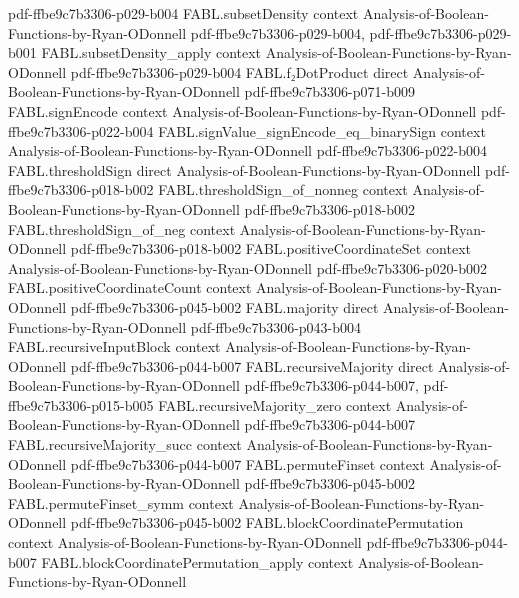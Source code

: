 \begin{theorem}
  {pdf-ffbe9c7b3306-p029-b004}
\proofstep
  {FABL.subsetDensity}
  {context}
  {Analysis-of-Boolean-Functions-by-Ryan-ODonnell}
  {pdf-ffbe9c7b3306-p029-b004,
    pdf-ffbe9c7b3306-p029-b001}
\proofstep
  {FABL.subsetDensity_apply}
  {context}
  {Analysis-of-Boolean-Functions-by-Ryan-ODonnell}
  {pdf-ffbe9c7b3306-p029-b004}
\proofstep
  {FABL.f₂DotProduct}
  {direct}
  {Analysis-of-Boolean-Functions-by-Ryan-ODonnell}
  {pdf-ffbe9c7b3306-p071-b009}
\proofstep
  {FABL.signEncode}
  {context}
  {Analysis-of-Boolean-Functions-by-Ryan-ODonnell}
  {pdf-ffbe9c7b3306-p022-b004}
\proofstep
  {FABL.signValue_signEncode_eq_binarySign}
  {context}
  {Analysis-of-Boolean-Functions-by-Ryan-ODonnell}
  {pdf-ffbe9c7b3306-p022-b004}
\proofstep
  {FABL.thresholdSign}
  {direct}
  {Analysis-of-Boolean-Functions-by-Ryan-ODonnell}
  {pdf-ffbe9c7b3306-p018-b002}
\proofstep
  {FABL.thresholdSign_of_nonneg}
  {context}
  {Analysis-of-Boolean-Functions-by-Ryan-ODonnell}
  {pdf-ffbe9c7b3306-p018-b002}
\proofstep
  {FABL.thresholdSign_of_neg}
  {context}
  {Analysis-of-Boolean-Functions-by-Ryan-ODonnell}
  {pdf-ffbe9c7b3306-p018-b002}
\proofstep
  {FABL.positiveCoordinateSet}
  {context}
  {Analysis-of-Boolean-Functions-by-Ryan-ODonnell}
  {pdf-ffbe9c7b3306-p020-b002}
\proofstep
  {FABL.positiveCoordinateCount}
  {context}
  {Analysis-of-Boolean-Functions-by-Ryan-ODonnell}
  {pdf-ffbe9c7b3306-p045-b002}
\proofstep
  {FABL.majority}
  {direct}
  {Analysis-of-Boolean-Functions-by-Ryan-ODonnell}
  {pdf-ffbe9c7b3306-p043-b004}
\proofstep
  {FABL.recursiveInputBlock}
  {context}
  {Analysis-of-Boolean-Functions-by-Ryan-ODonnell}
  {pdf-ffbe9c7b3306-p044-b007}
\proofstep
  {FABL.recursiveMajority}
  {direct}
  {Analysis-of-Boolean-Functions-by-Ryan-ODonnell}
  {pdf-ffbe9c7b3306-p044-b007,
    pdf-ffbe9c7b3306-p015-b005}
\proofstep
  {FABL.recursiveMajority_zero}
  {context}
  {Analysis-of-Boolean-Functions-by-Ryan-ODonnell}
  {pdf-ffbe9c7b3306-p044-b007}
\proofstep
  {FABL.recursiveMajority_succ}
  {context}
  {Analysis-of-Boolean-Functions-by-Ryan-ODonnell}
  {pdf-ffbe9c7b3306-p044-b007}
\proofstep
  {FABL.permuteFinset}
  {context}
  {Analysis-of-Boolean-Functions-by-Ryan-ODonnell}
  {pdf-ffbe9c7b3306-p045-b002}
\proofstep
  {FABL.permuteFinset_symm}
  {context}
  {Analysis-of-Boolean-Functions-by-Ryan-ODonnell}
  {pdf-ffbe9c7b3306-p045-b002}
\proofstep
  {FABL.blockCoordinatePermutation}
  {context}
  {Analysis-of-Boolean-Functions-by-Ryan-ODonnell}
  {pdf-ffbe9c7b3306-p044-b007}
\proofstep
  {FABL.blockCoordinatePermutation_apply}
  {context}
  {Analysis-of-Boolean-Functions-by-Ryan-ODonnell}

\end{theorem}
